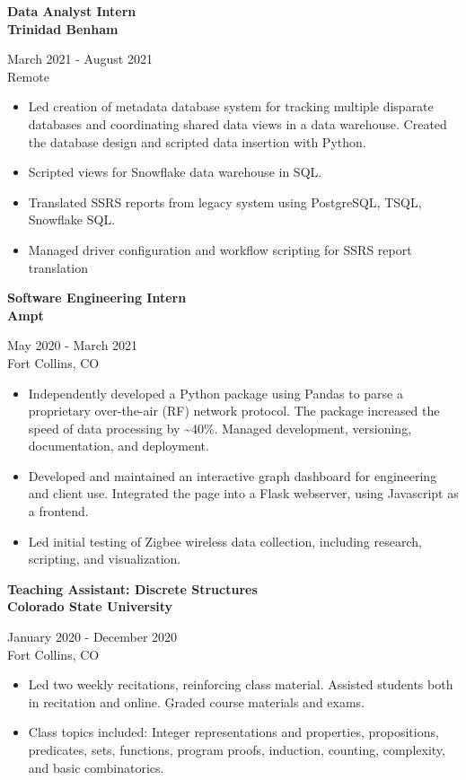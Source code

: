 \documentclass{article}
\newcommand{\resumeSubheading}[5]{
\noindent\begin{minipage}{0.5\textwidth}
	\begin{flushleft}
	\textbf{#1}\\
	\textbf{#2}\\
	\end{flushleft}
\end{minipage}%
\hfill
\begin{minipage}{0.5\textwidth}
	\begin{flushright}
	#3\\
	#4\\
	\end{flushright}
\end{minipage}%
\newline
#5
}
\begin{document}
\resumeSubheading{Data Analyst Intern}{Trinidad Benham}{March 2021 - August 2021}{Remote}{
\begin{itemize}

	\item Led creation of metadata database system for tracking multiple disparate databases and coordinating shared data views in a data warehouse.  Created the database design and scripted data insertion with Python.
	\item Scripted views for Snowflake data warehouse in SQL.
	\item Translated SSRS reports from legacy system using PostgreSQL, TSQL, Snowflake SQL.
	\item Managed driver configuration and workflow scripting for SSRS report translation %

\end{itemize}
}

\resumeSubheading{Software Engineering Intern}{Ampt}{May 2020 - March 2021}{Fort Collins, CO}{
\begin{itemize}

	\item Independently developed a Python package using Pandas to parse a proprietary over-the-air (RF) network protocol. The package increased the speed of data processing by \textasciitilde40\%. Managed development, versioning, documentation, and deployment. 
	\item Developed and maintained an interactive graph dashboard for engineering and client use. Integrated the page into a Flask webserver, using Javascript as a frontend.
	\item Led initial testing of Zigbee wireless data collection, including research, scripting, and visualization. %

\end{itemize}
}

\resumeSubheading{Teaching Assistant: Discrete Structures}{Colorado State University}{January 2020 - December 2020}{Fort Collins, CO}{ %
\begin{itemize} %

\item Led two weekly recitations, reinforcing class material.  Assisted students both in recitation and online. Graded course materials and exams. %
\item Class topics included: Integer representations and properties, propositions, predicates, sets, functions, program proofs, induction, counting, complexity, and basic combinatorics. %

\end{itemize} %
} %
\end{document}
